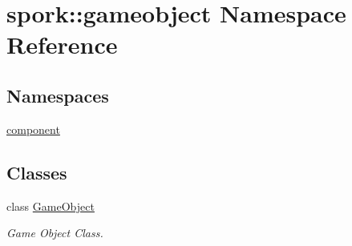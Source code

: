 \hypertarget{namespacespork_1_1gameobject}{}\section{spork\+:\+:gameobject Namespace Reference}
\label{namespacespork_1_1gameobject}
\subsection*{Namespaces}
\begin{DoxyCompactItemize}
\item 
 \hyperlink{namespacespork_1_1gameobject_1_1component}{component}
\end{DoxyCompactItemize}
\subsection*{Classes}
\begin{DoxyCompactItemize}
\item 
class \hyperlink{classspork_1_1gameobject_1_1_game_object}{Game\+Object}
\begin{DoxyCompactList}\small\item\em Game Object Class. \end{DoxyCompactList}\end{DoxyCompactItemize}
